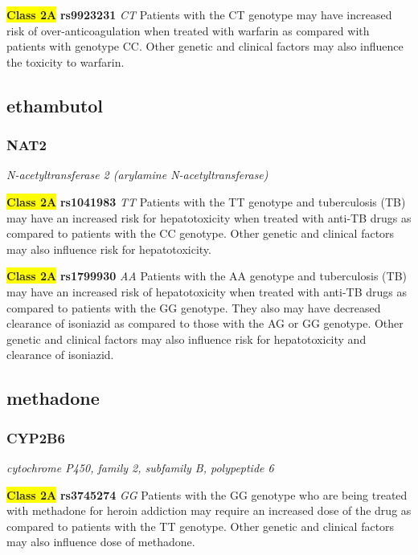 \documentclass{report}
\begin{document}
\textbf{\colorbox{yellow} {Class 2A}} \textbf{ rs9923231 } \textit{ CT }
Patients with the CT genotype may have increased risk of over-anticoagulation when treated with warfarin as compared with patients with genotype CC. Other genetic and clinical factors may also influence the toxicity to warfarin.\newline



\subsection{ ethambutol }\subsubsection{ NAT2 }
\textit{ N-acetyltransferase 2 (arylamine N-acetyltransferase) } \newline




\textbf{\colorbox{yellow} {Class 2A}} \textbf{ rs1041983 } \textit{ TT }
Patients with the TT genotype and tuberculosis (TB) may have an increased risk for hepatotoxicity when treated with anti-TB drugs as compared to patients with the CC genotype. Other genetic and clinical factors may also influence risk for hepatotoxicity.\newline

\textbf{\colorbox{yellow} {Class 2A}} \textbf{ rs1799930 } \textit{ AA }
Patients with the AA genotype and tuberculosis (TB) may have an increased risk of hepatotoxicity when treated with anti-TB drugs as compared to patients with the GG genotype. They also may have decreased clearance of isoniazid as compared to those with the AG or GG genotype. Other genetic and clinical factors may also influence risk for hepatotoxicity and clearance of isoniazid.\newline



\subsection{ methadone }\subsubsection{ CYP2B6 }
\textit{ cytochrome P450, family 2, subfamily B, polypeptide 6 } \newline




\textbf{\colorbox{yellow} {Class 2A}} \textbf{ rs3745274 } \textit{ GG }
Patients with the GG genotype who are being treated with methadone for heroin addiction may require an increased dose of the drug as compared to patients with the TT genotype. Other genetic and clinical factors may also influence dose of methadone.\newline
\end{document}
